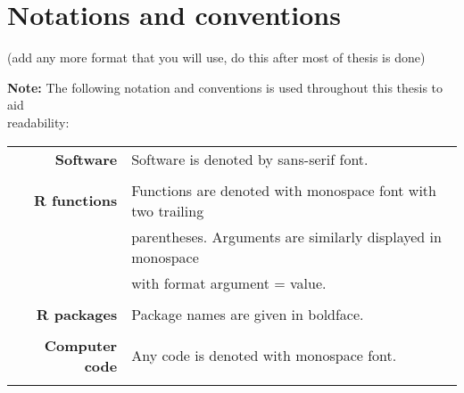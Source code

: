 	\color{red}
	
	\newpage
	\section{Notations and conventions }
	
	(add any more format that you will use, do this after most of thesis is done)
	
	\textbf{Note:} The following notation and conventions is used throughout this thesis to aid\\ readability:\\

	\begin{tabular}{rl}
	\textbf{Software} & Software is denoted by sans-serif font.\\\\
		\textbf{R functions} & Functions are denoted with monospace font with two trailing \\
		& parentheses. Arguments are similarly displayed in monospace \\
		& with format argument = value.\\\\
		\textbf{R packages} & Package names are given in boldface.\\\\
		\textbf{Computer code} &  Any code is denoted with monospace font.\\\\
	\end{tabular}

	\color{black}
